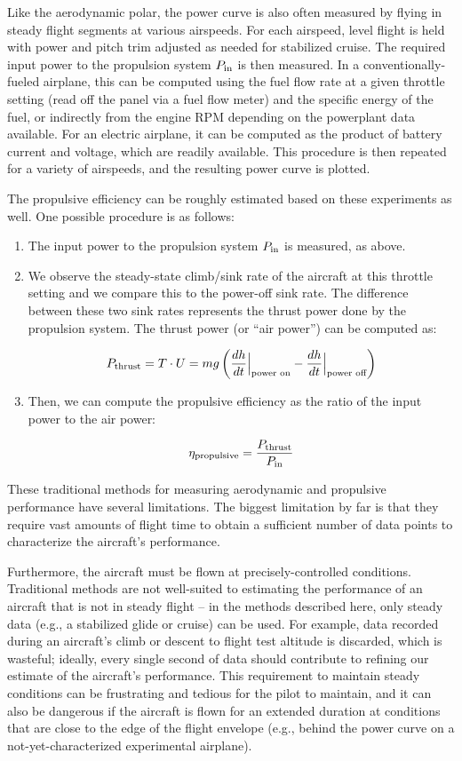 \documentclass[conf]{new-aiaa}
\begin{document}
    Like the aerodynamic polar, the power curve is also often measured by flying in steady flight segments at various airspeeds. For each airspeed, level flight is held with power and pitch trim adjusted as needed for stabilized cruise. The required input power to the propulsion system $P_{\rm in}$ is then measured. In a conventionally-fueled airplane, this can be computed using the fuel flow rate at a given throttle setting (read off the panel via a fuel flow meter) and the specific energy of the fuel, or indirectly from the engine RPM depending on the powerplant data available. For an electric airplane, it can be computed as the product of battery current and voltage, which are readily available. This procedure is then repeated for a variety of airspeeds, and the resulting power curve is plotted.

    The propulsive efficiency can be roughly estimated based on these experiments as well. One possible procedure is as follows:

    \begin{enumerate}
        \item The input power to the propulsion system $P_{\rm in}$ is measured, as above.
        \item We observe the steady-state climb/sink rate of the aircraft at this throttle setting and we compare this to the power-off sink rate. The difference between these two sink rates represents the thrust power done by the propulsion system. The thrust power (or ``air power'') can be computed as:

        $$P_{\rm thrust}=T \cdot U = m g \left( \frac{dh}{dt}\Big |_\text{power on} - \frac{dh}{dt}\Big |_\text{power off} \right)$$

        \item Then, we can compute the propulsive efficiency as the ratio of the input power to the air power:

        $$\eta_{\rm propulsive} = \frac{P_{\rm thrust}}{P_{\rm in}}$$

    \end{enumerate}

    These traditional methods for measuring aerodynamic and propulsive performance have several limitations. The biggest limitation by far is that they require vast amounts of flight time to obtain a sufficient number of data points to characterize the aircraft's performance.

    Furthermore, the aircraft must be flown at precisely-controlled conditions. Traditional methods are not well-suited to estimating the performance of an aircraft that is not in steady flight -- in the methods described here, only steady data (e.g., a stabilized glide or cruise) can be used. For example, data recorded during an aircraft's climb or descent to flight test altitude is discarded, which is wasteful; ideally, every single second of data should contribute to refining our estimate of the aircraft's performance. This requirement to maintain steady conditions can be frustrating and tedious for the pilot to maintain, and it can also be dangerous if the aircraft is flown for an extended duration at conditions that are close to the edge of the flight envelope (e.g., behind the power curve on a not-yet-characterized experimental airplane).
\end{document}
